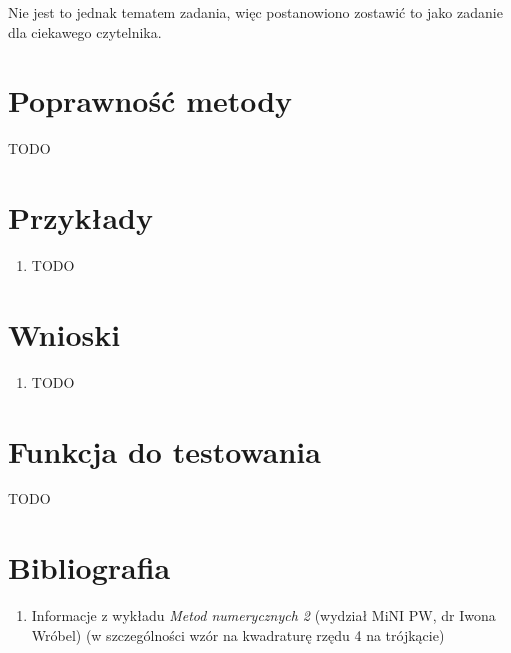 \documentclass[12pt]{article}
\begin{document}
	Nie jest to jednak tematem zadania, więc postanowiono zostawić to jako zadanie dla ciekawego czytelnika.
	
	
	
	
	\section{Poprawność metody}
	TODO
	
	
	
	
	
	
	\section{Przykłady}
	\begin{enumerate}[label=\textbf{Przykład \arabic*}]
		\item
		TODO
		
	\end{enumerate}
	
	
	
	
	
	
	\section{Wnioski}
	\begin{enumerate}
		\item TODO
	\end{enumerate}

	
	
	
	
	
	\section{Funkcja do testowania}
	TODO
	
	
	
	
	
	\section{Bibliografia}
	\begin{enumerate}
		\item Informacje z wykładu \textit{Metod numerycznych 2} (wydział MiNI PW, dr Iwona Wróbel) (w szczególności wzór na kwadraturę rzędu 4 na trójkącie)
	\end{enumerate}
	
\end{document}
